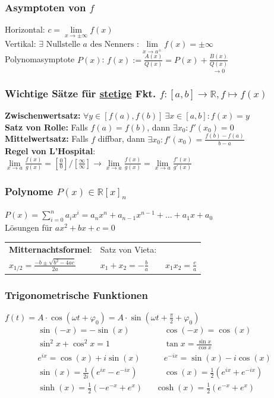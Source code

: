 \documentclass[6pt,a4paper]{scrartcl}
\newcommand{\enbrace}[1]{\ensuremath{\left(#1\right)}}
\newcommand{\ra}[0]{\ensuremath{\rightarrow}}
\begin{document}
\begin{multicols*}{4}
\subsubsection{Asymptoten von $f$}
Horizontal: $c=\lim\limits_{x\ra \pm \infty} f(x)$\\
Vertikal: $\exists \text{ Nullstelle } a \text{ des Nenners }: \lim\limits_{x \rightarrow a^{\pm}} f(x) = \pm \infty$\\
Polynomasymptote $P(x)$: $f(x):=\frac{A(x)}{Q(x)}=P(x)+ \underset{\ra 0}{\frac{B(x)}{Q(x)}}$ \\
\subsubsection{Wichtige Sätze für \underline{stetige} Fkt. $f: [a,b] \rightarrow \mathbb R, f \mapsto f(x)$ }
\textbf{Zwischenwertsatz:} $\forall y \in [f(a),f(b)]\ \exists x\in [a,b]:f(x)=y$\\
\textbf{Satz von Rolle:} Falls $f(a)=f(b)$, dann $\exists x_0: f' (x_0) = 0$\\
\textbf{Mittelwertsatz:} Falls $f$ diffbar, dann $\exists x_0:f'(x_0)=\frac{f(b)-f(a)}{b-a}$\\
\textbf{Regel von L'Hospital}:\\ $\lim\limits_{x \rightarrow a} \frac{f(x)}{g(x)} = \left[ \frac{0}{0} \right] / \left[ \frac{\infty}{\infty} \right] \rightarrow \lim\limits_{x \rightarrow a} \frac{f(x)}{g(x)} = \lim\limits_{x \rightarrow a} \frac{f'(x)}{g'(x)}$

\subsubsection{Polynome $P(x)\in\mathbb R[x]_n$}
$P(x)=\sum_{i=0}^n a_ix^i=a_n x^n+a_{n-1} x^{n-1}+\dotsc+a_1x+a_0$ \\
Lösungen für $ax^2+bx+c=0$ \\
\begin{tabular}{l|l}
\textbf{Mitternachtsformel}:  &  Satz von Vieta:\\
$x_{1/2}=\frac{-b\pm\sqrt{b^2-4ac}}{2a}$  \quad & \quad   $x_1 + x_2 = - \frac{b}{a} \qquad x_1 x_2 = \frac{c}{a}$
\end{tabular}

\subsubsection{Trigonometrische Funktionen}
$f(t)=A\cdot \cos(\omega t + \varphi_0)=A\cdot \sin(\omega t + \frac{\pi}{2}+ \varphi_0)$
\begin{eqnarray*}
	\sin (-x) = -\sin (x)  \quad & \quad \cos (-x) = \cos (x) \\
	\sin^2 x + \cos^2 x = 1  \quad & \quad \tan x = \frac{\sin x}{\cos x} \\
	e^{ix}=\cos(x)+i\sin(x) \quad & \quad e^{-ix}=\sin(x)-i\cos(x) \\
	\sin(x)=\frac{1}{2i}\enbrace{e^{ix}-e^{-ix}} \quad & \quad \cos(x)=\frac{1}{2}\enbrace{e^{ix}+e^{-ix}} \\
	\sinh(x)=\frac{1}{2}(-e^{-x}+e^x) & \cosh(x)=\frac{1}{2}(e^{-x}+e^x)
\end{eqnarray*}

\end{multicols*}
\end{document}
